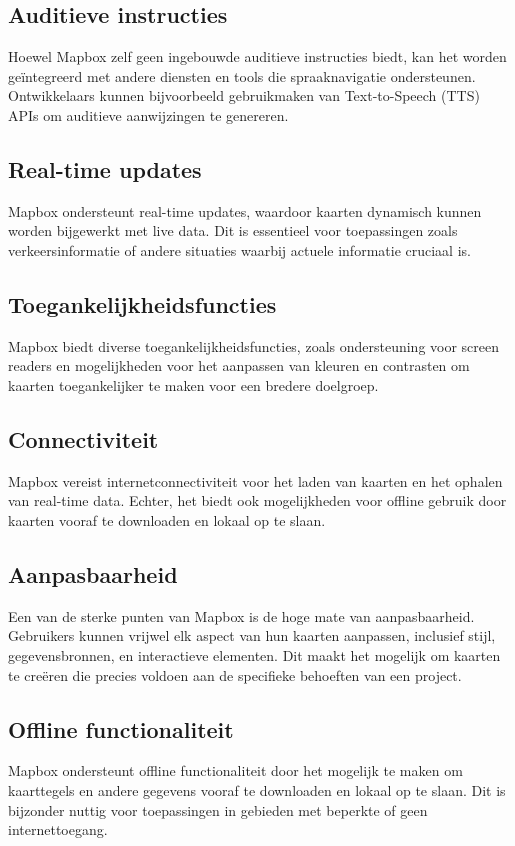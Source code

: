 \subsection*{Auditieve instructies}
Hoewel Mapbox zelf geen ingebouwde auditieve instructies biedt, kan het worden geïntegreerd met andere diensten en tools die spraaknavigatie ondersteunen. Ontwikkelaars kunnen bijvoorbeeld gebruikmaken van Text-to-Speech (TTS) APIs om auditieve aanwijzingen te genereren.

\subsection*{Real-time updates}
Mapbox ondersteunt real-time updates, waardoor kaarten dynamisch kunnen worden bijgewerkt met live data. Dit is essentieel voor toepassingen zoals verkeersinformatie of andere situaties waarbij actuele informatie cruciaal is.

\subsection*{Toegankelijkheidsfuncties}
Mapbox biedt diverse toegankelijkheidsfuncties, zoals ondersteuning voor screen readers en mogelijkheden voor het aanpassen van kleuren en contrasten om kaarten toegankelijker te maken voor een bredere doelgroep. 

\subsection*{Connectiviteit}
Mapbox vereist internetconnectiviteit voor het laden van kaarten en het ophalen van real-time data. Echter, het biedt ook mogelijkheden voor offline gebruik door kaarten vooraf te downloaden en lokaal op te slaan.

\subsection*{Aanpasbaarheid}
Een van de sterke punten van Mapbox is de hoge mate van aanpasbaarheid. Gebruikers kunnen vrijwel elk aspect van hun kaarten aanpassen, inclusief stijl, gegevensbronnen, en interactieve elementen. Dit maakt het mogelijk om kaarten te creëren die precies voldoen aan de specifieke behoeften van een project.

\subsection*{Offline functionaliteit}
Mapbox ondersteunt offline functionaliteit door het mogelijk te maken om kaarttegels en andere gegevens vooraf te downloaden en lokaal op te slaan. Dit is bijzonder nuttig voor toepassingen in gebieden met beperkte of geen internettoegang.

